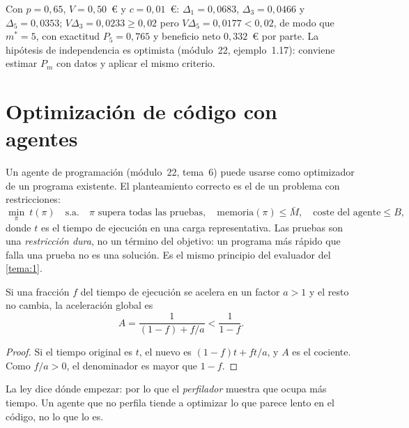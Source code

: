 Con $p=0{,}65$, $V=0{,}50$~€ y $c=0{,}01$~€: $\Delta_1=0{,}0683$, $\Delta_3=0{,}0466$ y $\Delta_5=0{,}0353$; $V\Delta_3=0{,}0233\ge0{,}02$ pero $V\Delta_5=0{,}0177<0{,}02$, de modo que $m^{*}=5$, con exactitud $P_5=0{,}765$ y beneficio neto $0{,}332$~€ por parte. La hipótesis de independencia es optimista (módulo~22, ejemplo~1.17): conviene estimar $P_m$ con datos y aplicar el mismo criterio.

\section{Optimización de código con agentes}

Un agente de programación (módulo~22, tema~6) puede usarse como optimizador de un programa existente. El planteamiento correcto es el de un problema con restricciones:
\[
\min_{\pi}\ t(\pi)\quad\text{s.a.}\quad \pi \text{ supera todas las pruebas},\quad \text{memoria}(\pi)\le \bar M,\quad \text{coste del agente}\le B,
\]
donde $t$ es el tiempo de ejecución en una carga representativa. Las pruebas son una \emph{restricción dura}, no un término del objetivo: un programa más rápido que falla una prueba no es una solución. Es el mismo principio del evaluador del \cref{tema:1}.

\begin{proposicion}\label{prop:amdahl}
Si una fracción $f$ del tiempo de ejecución se acelera en un factor $a>1$ y el resto no cambia, la aceleración global es
\[
A=\frac{1}{(1-f)+f/a}<\frac{1}{1-f}.
\]
\end{proposicion}

\begin{proof}
Si el tiempo original es $t$, el nuevo es $(1-f)t+ft/a$, y $A$ es el cociente. Como $f/a>0$, el denominador es mayor que $1-f$.
\end{proof}

La ley dice dónde empezar: por lo que el \emph{perfilador} muestra que ocupa más tiempo. Un agente que no perfila tiende a optimizar lo que parece lento en el código, no lo que lo es.

